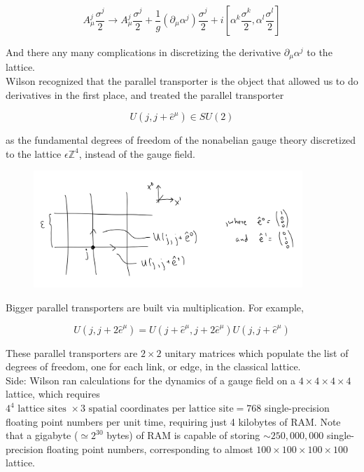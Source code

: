 \begin{equation}
A_\mu^j \frac{\sigma^j}{2} \rightarrow A_\mu^j \frac{\sigma^j}{2} + \frac{1}{g} (\partial_\mu \alpha^j) \frac{\sigma^j}{2} + i \left[\alpha^k \frac{\sigma^k}{2}, \alpha^l \frac{\sigma^l}{2}\right]
\end{equation}

\noindent And there any many complications in discretizing the derivative $\partial_\mu \alpha^j$ to the lattice. \\

\noindent Wilson recognized that the parallel transporter is the object that allowed us to do derivatives in the first place, and treated the parallel transporter 

\begin{equation}
U(j, j+\hat{e}^\mu) \in SU(2)
\end{equation}

as the fundamental degrees of freedom of the nonabelian gauge theory discretized to the lattice $\epsilon \mathbb{Z}^4$, instead of the gauge field.

\begin{figure}[H]
	\centering
	\includegraphics[width=4in]{images/wilson_parallel1.png}
	\caption*{}
\end{figure}

\noindent Bigger parallel transporters are built via multiplication. For example,

\begin{equation}
U(j, j+2\hat{e}^\mu) = U(j + \hat{e}^\mu, j+2\hat{e}^\mu)U(j, j+\hat{e}^\mu)
\end{equation}

\noindent These parallel transporters are $2 \times 2$ unitary matrices which populate the list of degrees of freedom, one for each link, or edge, in the classical lattice.\\

\noindent Side: Wilson ran calculations for the dynamics of a gauge field on a $4 \times 4 \times 4 \times 4$ lattice, which requires $4^4 \text{ lattice sites } \times 3 \text{ spatial coordinates per lattice site} = 768$ single-precision floating point numbers per unit time, requiring just 4 kilobytes of RAM. Note that a gigabyte ($\simeq 2^{30}$ bytes) of RAM is capable of storing $\sim 250,000,000$ single-precision floating point numbers, corresponding to almost $100 \times 100 \times 100 \times 100$ lattice. \\

